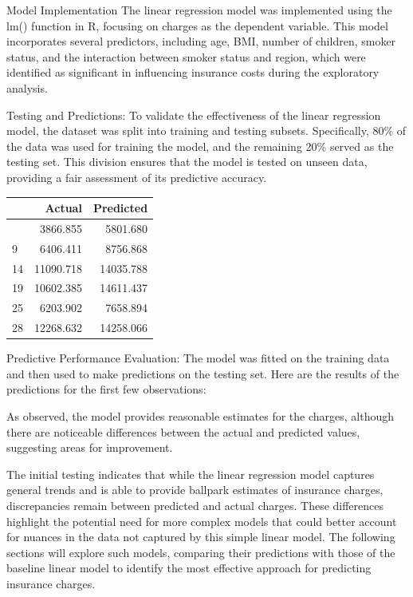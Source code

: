 \documentclass[
  12pt,
]{article}
\begin{document}
Model Implementation The linear regression model was implemented using
the lm() function in R, focusing on charges as the dependent variable.
This model incorporates several predictors, including age, BMI, number
of children, smoker status, and the interaction between smoker status
and region, which were identified as significant in influencing
insurance costs during the exploratory analysis.

Testing and Predictions: To validate the effectiveness of the linear
regression model, the dataset was split into training and testing
subsets. Specifically, 80\% of the data was used for training the model,
and the remaining 20\% served as the testing set. This division ensures
that the model is tested on unseen data, providing a fair assessment of
its predictive accuracy.

\begin{longtable}[]{@{}lrr@{}}
\toprule\noalign{}
& Actual & Predicted \\
\midrule\noalign{}
\endhead
\bottomrule\noalign{}
\endlastfoot
5 & 3866.855 & 5801.680 \\
9 & 6406.411 & 8756.868 \\
14 & 11090.718 & 14035.788 \\
19 & 10602.385 & 14611.437 \\
25 & 6203.902 & 7658.894 \\
28 & 12268.632 & 14258.066 \\
\end{longtable}

Predictive Performance Evaluation: The model was fitted on the training
data and then used to make predictions on the testing set. Here are the
results of the predictions for the first few observations:

As observed, the model provides reasonable estimates for the charges,
although there are noticeable differences between the actual and
predicted values, suggesting areas for improvement.

The initial testing indicates that while the linear regression model
captures general trends and is able to provide ballpark estimates of
insurance charges, discrepancies remain between predicted and actual
charges. These differences highlight the potential need for more complex
models that could better account for nuances in the data not captured by
this simple linear model. The following sections will explore such
models, comparing their predictions with those of the baseline linear
model to identify the most effective approach for predicting insurance
charges.
\end{document}

